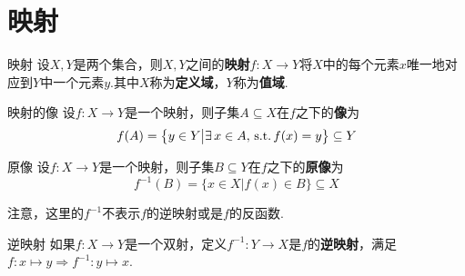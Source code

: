 \section{映射}

\begin{definition}{映射}
    设$X,Y$是两个集合，则$X,Y$之间的\textbf{映射}$f:X\to Y$将$X$中的每个元素$x$唯一地对应到$Y$中一个元素$y$.其中$X$称为\textbf{定义域}，$Y$称为\textbf{值域}.
\end{definition}

\begin{definition}{映射的像}
    设$f:X\to Y$是一个映射，则子集$A\subseteq X$在$f$之下的\textbf{像}为
    \[f(A)=\big\{y\in Y\big|\exists\, x\in A,\,\operatorname{\text{s.t.}} f(x)=y \big\}\subseteq Y\]
\end{definition}

\begin{definition}{原像}
    设$f:X\to Y$是一个映射，则子集$B\subseteq Y$在$f$之下的\textbf{原像}为
    \[f^{-1}(B)=\big\{x\in X\big|f(x)\in B \big\}\subseteq X\]
\end{definition}

\begin{notice}
    注意，这里的$f^{-1}$不表示$f$的逆映射或是$f$的反函数.
\end{notice}

\begin{definition}{逆映射}
    如果$f:X\to Y$是一个双射，定义$f^{-1}:Y\to X$是$f$的\textbf{逆映射}，满足$f:x\mapsto y \Rightarrow f^{-1}:y\mapsto x$.
\end{definition}

